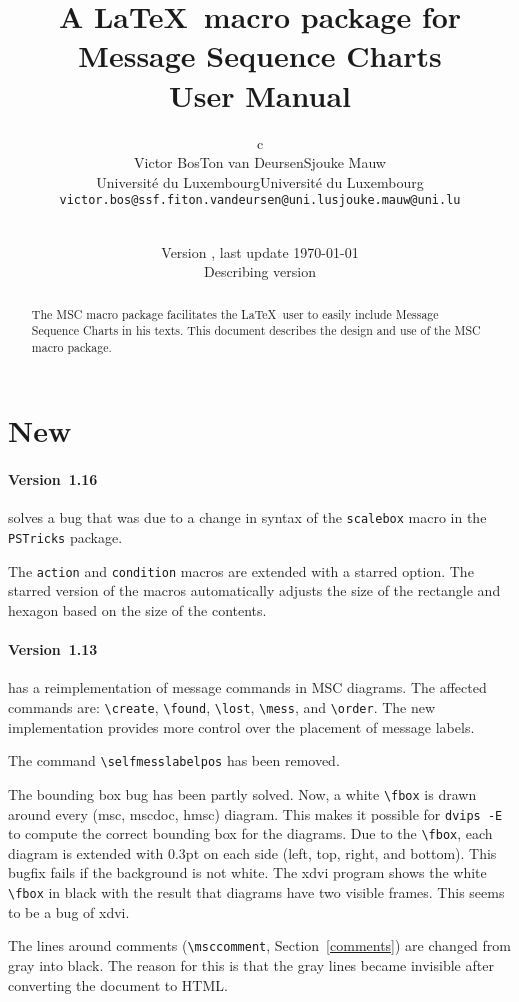 \documentclass[12pt,a4paper]{article}
\title{
  A \LaTeX\ macro package for Message Sequence Charts\\{\large User Manual}
}
\author{
 \begin{tabular}{c}
  \begin{tabular}{ccc}
   Victor Bos &
   Ton van Deursen &
   Sjouke Mauw \\
   &
   \scriptsize Universit\'e du Luxembourg &
   \scriptsize Universit\'e du Luxembourg \\[-0.8ex]
   \scriptsize \texttt{victor.bos@ssf.fi} &
   \scriptsize \texttt{ton.vandeursen@uni.lu} & 
   \scriptsize \texttt{sjouke.mauw@uni.lu}
  \end{tabular}\\
 \end{tabular}
}
\date{\small Version \mscversion, last update \today\\
      Describing \mscpack{} version \mscversion}
\newcommand{\acro}[1]{{#1}}
\newcommand{\MSC}{\acro{MSC}}
\newcommand{\mscpack}{\MSC{} macro package}
\begin{document}
\maketitle

\begin{abstract}
\noindent
The \mscpack{} facilitates the \LaTeX\ user to easily include
Message Sequence Charts in his texts. This document describes the
design and use of the \mscpack.
\end{abstract}

\tableofcontents
\section{New}
\label{new}

\paragraph{Version~1.16} solves a bug that was due to a change in
syntax of the \verb+scalebox+ macro in the \verb+PSTricks+ package.

The \verb+action+ and \verb+condition+ macros are extended with a
starred option. The starred version of the macros automatically
adjusts the size of the rectangle and hexagon based on the size of the
contents. 

\paragraph{Version~1.13} has a reimplementation of message commands in MSC
diagrams. The affected commands are: \verb+\create+, \verb+\found+,
\verb+\lost+, \verb+\mess+, and \verb+\order+. The new implementation
provides more control over the placement of message labels.

The command \verb+\selfmesslabelpos+ has been removed.

The bounding box bug has been partly solved. Now, a white \verb+\fbox+
is drawn around every (msc, mscdoc, hmsc) diagram. This makes it
possible for \texttt{dvips -E} to compute the correct bounding box for
the diagrams. Due to the \verb+\fbox+, each diagram is extended with
0.3pt on each side (left, top, right, and bottom). This bugfix fails
if the background is not white. The xdvi program shows the white
\verb+\fbox+ in black with the result that diagrams have two visible
frames. This seems to be a bug of xdvi.

The lines around comments (\verb+\msccomment+, Section~\ref{comments})
are changed from gray into black. The reason for this is that the gray
lines became invisible after converting the document to HTML.
\end{document}
